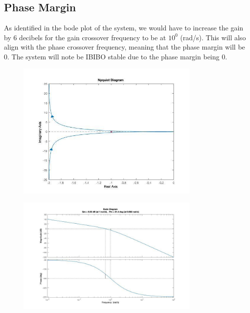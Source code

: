 \subsection{Phase Margin}

As identified in the bode plot of the system, we would have to increase the gain by 6 decibels for the gain crossover frequency to be at $10^0$ (rad/s). This will also align with the phase crossover frequency, meaning that the phase margin will be 0. The system will note be IBIBO stable due to the phase margin being 0.

\begin{figure}[H]
	\centering
	\includegraphics[width=0.8\textwidth]{./figures/lab8-Nyquist-Phase-Diagram.jpg}
	\caption{}
	\label{fig:}
\end{figure}

\begin{figure}[H]
	\centering
	\includegraphics[width=0.8\textwidth]{./figures/lab8-Bode-Phase-Diagram.jpg}
	\caption{}
	\label{fig:}
\end{figure}
